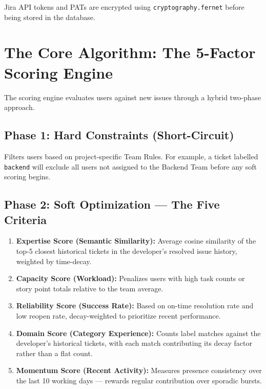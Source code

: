 \documentclass[12pt, a4paper]{article}
\begin{document}
Jira API tokens and PATs are encrypted using \texttt{cryptography.fernet} before being stored in the database.


\section{The Core Algorithm: The 5-Factor Scoring Engine}

The scoring engine evaluates users against new issues through a hybrid two-phase approach.

\subsection{Phase 1: Hard Constraints (Short-Circuit)}

Filters users based on project-specific Team Rules. For example, a ticket labelled \texttt{backend} will exclude all users not assigned to the Backend Team before any soft scoring begins.

\subsection{Phase 2: Soft Optimization — The Five Criteria}

\begin{enumerate}
    \item \textbf{Expertise Score (Semantic Similarity):} Average cosine similarity of the top-5 closest historical tickets in the developer's resolved issue history, weighted by time-decay.
    \item \textbf{Capacity Score (Workload):} Penalizes users with high task counts or story point totals relative to the team average.
    \item \textbf{Reliability Score (Success Rate):} Based on on-time resolution rate and low reopen rate, decay-weighted to prioritize recent performance.
    \item \textbf{Domain Score (Category Experience):} Counts label matches against the developer's historical tickets, with each match contributing its decay factor rather than a flat count.
    \item \textbf{Momentum Score (Recent Activity):} Measures presence consistency over the last 10 working days — rewards regular contribution over sporadic bursts.
\end{enumerate}
\end{document}
